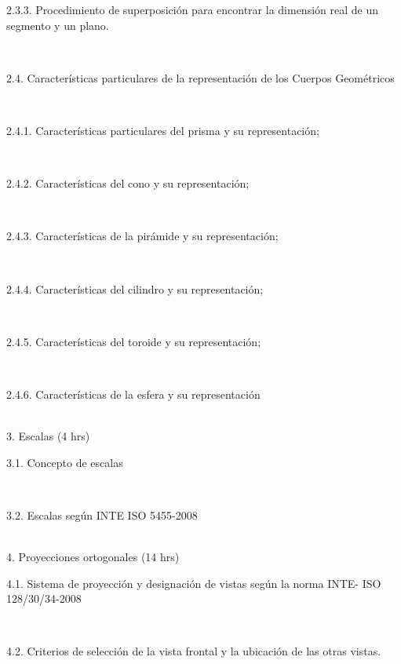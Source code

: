 \documentclass[letterpaper]{article}%
\begin{document}
\hspace*{0.04\linewidth}\parbox{0.96\linewidth}{\strut 2.3.3. Procedimiento de superposición para encontrar la dimensión real de un segmento y un plano.\strut}\\
\hspace*{0.02\linewidth}\parbox{0.98\linewidth}{\strut 2.4. Características particulares de la representación de los Cuerpos Geométricos\strut}\\
\hspace*{0.04\linewidth}\parbox{0.96\linewidth}{\strut 2.4.1. Características particulares del prisma y su representación;\strut}\\
\hspace*{0.04\linewidth}\parbox{0.96\linewidth}{\strut 2.4.2. Características del cono y su representación;\strut}\\
\hspace*{0.04\linewidth}\parbox{0.96\linewidth}{\strut 2.4.3. Características de la pirámide y su representación;\strut}\\
\hspace*{0.04\linewidth}\parbox{0.96\linewidth}{\strut 2.4.4. Características del cilindro y su representación;\strut}\\
\hspace*{0.04\linewidth}\parbox{0.96\linewidth}{\strut 2.4.5. Características del toroide y su representación;\strut}\\
\hspace*{0.04\linewidth}\parbox{0.96\linewidth}{\strut 2.4.6. Características de la esfera y su representación\strut}\\
3. Escalas (4 hrs)\\
\hspace*{0.02\linewidth}\parbox{0.98\linewidth}{\strut 3.1. Concepto de escalas\strut}\\
\hspace*{0.02\linewidth}\parbox{0.98\linewidth}{\strut 3.2. Escalas según INTE ISO 5455-2008\strut}\\
4. Proyecciones ortogonales (14 hrs)\\
\hspace*{0.02\linewidth}\parbox{0.98\linewidth}{\strut 4.1. Sistema de proyección y designación de vistas según la norma INTE- ISO 128/30/34-2008\strut}\\
\hspace*{0.02\linewidth}\parbox{0.98\linewidth}{\strut 4.2. Criterios de selección de la vista frontal y la ubicación de las otras vistas.\strut}\\
\end{document}
